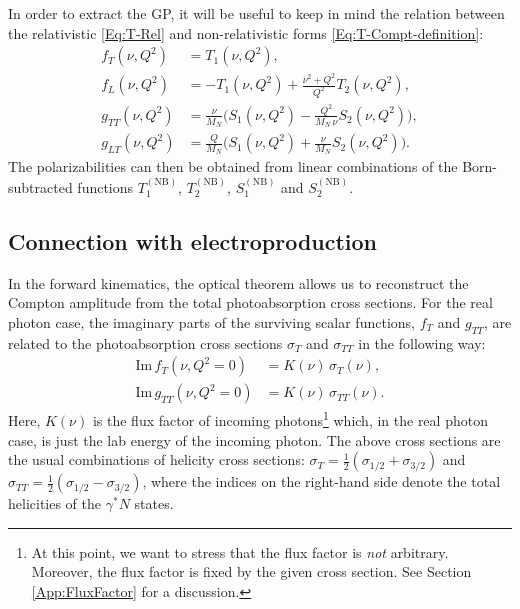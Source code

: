 \documentclass[twocolumn,prc,showpacs,nofootinbib,preprintnumbers,amsmath,amssymb,superscriptaddress]{revtex4-1}
\def\half{\mbox{$\frac{1}{2}$}}
\begin{document}
In order to extract the GP, it will be useful to keep in mind the relation between the relativistic \eqref{Eq:T-Rel} and non-relativistic forms \eqref{Eq:T-Compt-definition}:
\begin{subequations}
\begin{align}
  f_T(\nu,Q^2) &= T_1(\nu,Q^2), \label{Eq:fT-T1}\\
  f_L(\nu,Q^2) &= - T_1(\nu,Q^2) +  \frac{\nu^2 + Q^2}{Q^2} T_2(\nu,Q^2), \label{Eq:fL-T1T2}\\
 g_{TT}(\nu, Q^2) &= \frac{\nu}{M_N}\Big( S_1(\nu,Q^2) - \frac{Q^2}{M_N\,\nu} S_2(\nu,Q^2)\Big),\label{Eq:gTT-S1S2}\\
  g_{LT}(\nu, Q^2) &= \frac{Q}{M_N}\Big( S_1(\nu,Q^2) + \frac{\nu}{M_N} S_2(\nu,Q^2)\Big).\label{Eq:gLT-S1S2}
\end{align} 
\end{subequations}
The polarizabilities can then be obtained from linear combinations of the Born-subtracted functions $T_1^{(\mathrm{NB})}$, $T_2^{(\mathrm{NB})}$, $S_1^{(\mathrm{NB})}$ and $S_2^{(\mathrm{NB})}$. 


\subsection{Connection with electroproduction}
\label{Sec:ConnectionWithElectroproduction}

In the forward kinematics, the optical theorem allows us to reconstruct the Compton amplitude from the total photoabsorption cross sections. 
For the real photon case, the imaginary parts of the surviving scalar functions, $f_T$ and $g_{TT}$, are related to the photoabsorption cross sections $\sigma_T$ and $\sigma_{TT}$ in the following way:
\begin{subequations}
\begin{align}
\text{Im}\, f_T(\nu, Q^2=0)&= K(\nu)\, \sigma_T(\nu), \label{Eq:ImfTRealPhoton}\\
\text{Im}\,  g_{TT}(\nu, Q^2=0)&=K(\nu)\, \sigma_{TT}(\nu).\label{Eq:ImgTTRealPhoton}
\end{align}
\end{subequations}
Here, $K(\nu)$ is the flux factor of incoming photons\footnote{At this point, we want to stress that the flux factor is {\itshape not} arbitrary. Moreover, the flux factor is fixed by the given cross section. See Section \ref{App:FluxFactor} for a discussion.} which, in the real photon case, is just the lab energy of the incoming photon. The above cross sections are the usual combinations of helicity cross sections: $\sigma_T=\half(\sigma_{1/2}+\sigma_{3/2})$ and $\sigma_{TT}=\half(\sigma_{1/2}-\sigma_{3/2})$, where the indices on the right-hand side denote the total helicities of the $\gamma^\ast N$ states.
 
\end{document}
